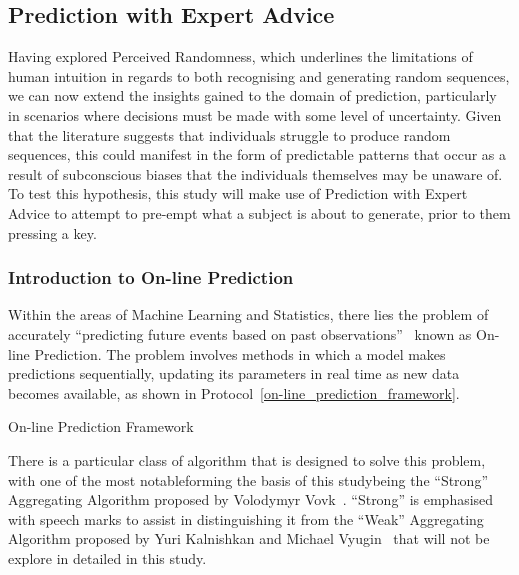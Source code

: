 \subsection{Prediction with Expert Advice}\label{subsection:prediction_with_expert_advice}
Having explored Perceived Randomness, which underlines the limitations of human intuition in regards to both recognising and generating random sequences, we can now extend the insights gained to the domain of prediction, particularly in scenarios where decisions must be made with some level of uncertainty. Given that the literature suggests that individuals struggle to produce random sequences, this could manifest in the form of predictable patterns that occur as a result of subconscious biases that the individuals themselves may be unaware of. To test this hypothesis, this study will make use of Prediction with Expert Advice to attempt to pre-empt what a subject is about to generate, prior to them pressing a key.

\subsubsection{Introduction to On-line Prediction}\label{subsubsection:introduction_to_on-line_prediction}
Within the areas of Machine Learning and Statistics, there lies the problem of accurately ``predicting future events based on past observations''~\cite{cesa-bianchi:1997} known as On-line Prediction. The problem involves methods in which a model makes predictions sequentially, updating its parameters in real time as new data becomes available, as shown in Protocol~\ref{on-line_prediction_framework}.

\begin{protocol}[H]
    \caption{On-line Prediction Framework}\label{on-line_prediction_framework}
    \begin{algorithmic}[1]
    \end{algorithmic}
\end{protocol}

There is a particular class of algorithm that is designed to solve this problem, with one of the most notable\textemdash{}forming the basis of this study\textemdash{}being the ``Strong'' Aggregating Algorithm proposed by Volodymyr Vovk~\cite{vovk:1990}. ``Strong'' is emphasised with speech marks to assist in distinguishing it from the ``Weak'' Aggregating Algorithm proposed by Yuri Kalnishkan and Michael Vyugin~\cite{kalnishkan/vyugin:2008} that will not be explore in detailed in this study.

